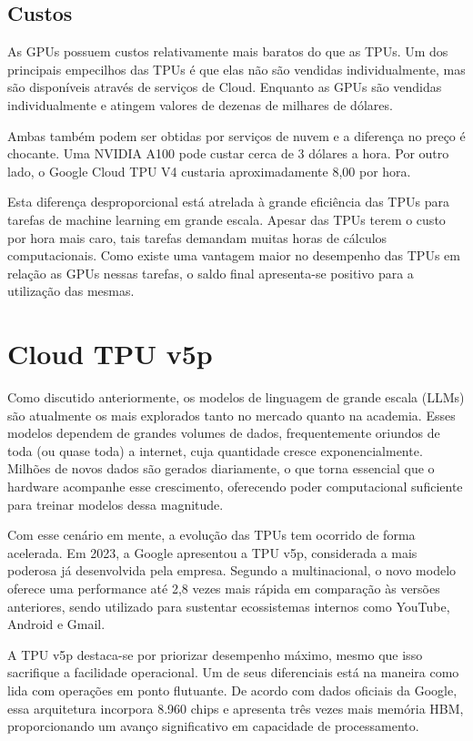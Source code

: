 \documentclass{report}
\begin{document}
\section{Custos}

As GPUs possuem custos relativamente mais baratos do que as TPUs. Um dos principais empecilhos das TPUs é que elas não são vendidas individualmente, mas são disponíveis através de serviços de Cloud. Enquanto as GPUs são vendidas individualmente e atingem valores de dezenas de milhares de dólares.

Ambas também podem ser obtidas por serviços de nuvem e a diferença no preço é chocante. Uma NVIDIA A100 pode custar cerca de 3 dólares a hora. Por outro lado, o Google Cloud TPU V4 custaria aproximadamente 8,00 por hora.

Esta diferença desproporcional está atrelada à grande eficiência das TPUs para tarefas de machine learning em grande escala. Apesar das TPUs terem o custo por hora mais caro, tais tarefas demandam muitas horas de cálculos computacionais. Como existe uma vantagem maior no desempenho das TPUs em relação as GPUs nessas tarefas, o saldo final apresenta-se positivo para a utilização das mesmas.

\chapter{Cloud TPU v5p}

Como discutido anteriormente, os modelos de linguagem de grande escala (LLMs) são atualmente os mais explorados tanto no mercado quanto na academia. Esses modelos dependem de grandes volumes de dados, frequentemente oriundos de toda (ou quase toda) a internet, cuja quantidade cresce exponencialmente. Milhões de novos dados são gerados diariamente, o que torna essencial que o hardware acompanhe esse crescimento, oferecendo poder computacional suficiente para treinar modelos dessa magnitude.

Com esse cenário em mente, a evolução das TPUs tem ocorrido de forma acelerada. Em 2023, a Google apresentou a TPU v5p, considerada a mais poderosa já desenvolvida pela empresa. Segundo a multinacional, o novo modelo oferece uma performance até 2,8 vezes mais rápida em comparação às versões anteriores, sendo utilizado para sustentar ecossistemas internos como YouTube, Android e Gmail.

A TPU v5p destaca-se por priorizar desempenho máximo, mesmo que isso sacrifique a facilidade operacional. Um de seus diferenciais está na maneira como lida com operações em ponto flutuante. De acordo com dados oficiais da Google, essa arquitetura incorpora 8.960 chips e apresenta três vezes mais memória HBM, proporcionando um avanço significativo em capacidade de processamento.
\end{document}
